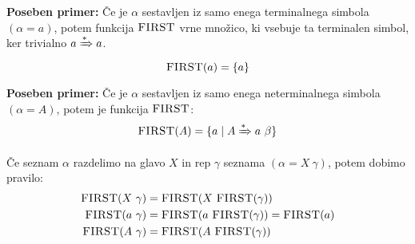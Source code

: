 \documentclass{article}
\newcommand{\Special}[1]{\textbf{#1}}
\newcommand{\FIRST}{\textsc{FIRST}}
\newcommand{\Set}[1]{\mathbf{#1}}
\newcommand{\Terminals}{\Set{T}}
\newcommand{\DeriveStar}{\xRightarrow{\ast}}
\newcommand{\Seq}{\ }
\begin{document}
\Special{Poseben primer:} Če je $\alpha$ sestavljen iz samo enega terminalnega simbola ${(\alpha = a)}$, potem funkcija $\FIRST$ vrne množico, ki vsebuje ta terminalen simbol, ker trivialno $a \DeriveStar a$.
\begin{equation*}
  \FIRST(a) = \{ a \}
\end{equation*}

\Special{Poseben primer:} Če je $\alpha$ sestavljen iz samo enega neterminalnega simbola ${(\alpha = A)}$, potem je funkcija $\FIRST$:
\begin{equation*}
  \FIRST(A) = \{ a \mid A \DeriveStar a \Seq \beta \}
\end{equation*}

Če seznam $\alpha$ razdelimo na glavo $X$ in rep $\gamma$ seznama ${(\alpha = X \Seq \gamma)}$, potem dobimo pravilo:
\begin{align*}
  \FIRST(X \Seq \gamma) &= \FIRST(X \Seq \FIRST(\gamma))\\
  \FIRST(a \Seq \gamma) &= \FIRST(a \Seq \FIRST(\gamma)) = \FIRST(a) \\
  \FIRST(A \Seq \gamma) &= \FIRST(A \Seq \FIRST(\gamma)) 
\end{align*}

%
%
%
%
%
%

\end{document}

